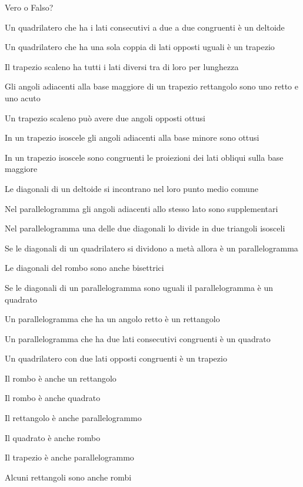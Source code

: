 \begin{esercizio}
\label{ese:4.2}
Vero o Falso?
\begin{enumeratea}
\item Un quadrilatero che ha i lati consecutivi a due a due congruenti è un deltoide\hfill\boxV\quad\boxF
\item Un quadrilatero che ha una sola coppia di lati opposti uguali è un trapezio\hfill\boxV\quad\boxF
\item Il trapezio scaleno ha tutti i lati diversi tra di loro per lunghezza\hfill\boxV\quad\boxF
\item Gli angoli adiacenti alla base maggiore di un trapezio rettangolo sono uno retto e uno acuto\hfill\boxV\quad\boxF
\item Un trapezio scaleno può avere due angoli opposti ottusi\hfill\boxV\quad\boxF
\item In un trapezio isoscele gli angoli adiacenti alla base minore sono ottusi\hfill\boxV\quad\boxF
\item In un trapezio isoscele sono congruenti le proiezioni dei lati obliqui sulla base maggiore\tab\hfill\boxV\quad\boxF
\item Le diagonali di un deltoide si incontrano nel loro punto medio comune\hfill\boxV\quad\boxF
\item Nel parallelogramma gli angoli adiacenti allo stesso lato sono supplementari\hfill\boxV\quad\boxF
\item Nel parallelogramma una delle due diagonali lo divide in due triangoli isosceli\tab\tab\tab\hfill\boxV\quad\boxF
\item Se le diagonali di un quadrilatero si dividono a metà allora è un parallelogramma\tab\tab\hfill\boxV\quad\boxF
\item Le diagonali del rombo sono anche bisettrici\hfill\boxV\quad\boxF
\item Se le diagonali di un parallelogramma sono uguali il parallelogramma è un quadrato\tab\tab\hfill\boxV\quad\boxF
\item Un parallelogramma che ha un angolo retto è un rettangolo\hfill\boxV\quad\boxF
\item Un parallelogramma che ha due lati consecutivi congruenti è un quadrato\hfill\boxV\quad\boxF
\item Un quadrilatero con due lati opposti congruenti è un trapezio\hfill\boxV\quad\boxF
\item Il rombo è anche un rettangolo\hfill\boxV\quad\boxF
\item Il rombo è anche quadrato\hfill\boxV\quad\boxF
\item Il rettangolo è anche parallelogrammo\hfill\boxV\quad\boxF
\item Il quadrato è anche rombo\hfill\boxV\quad\boxF
\item Il trapezio è anche parallelogrammo\hfill\boxV\quad\boxF
\item Alcuni rettangoli sono anche rombi\hfill\boxV\quad\boxF
\end{enumeratea}
\end{esercizio}

